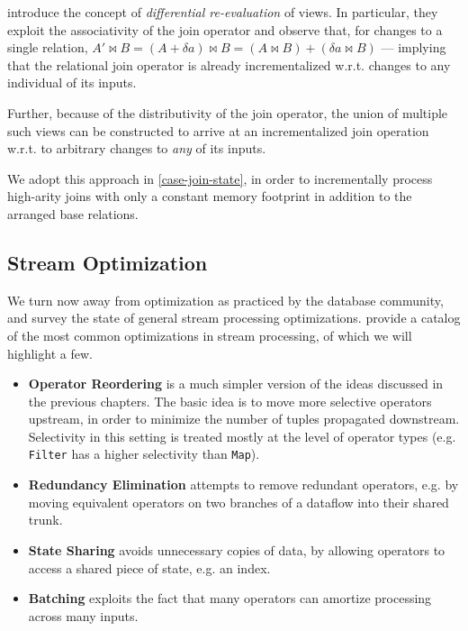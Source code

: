 \documentclass[../index.tex]{subfiles}
\begin{document}
\cite{blakeley1986efficiently} introduce the concept of
\emph{differential re-evaluation} of views. In particular, they
exploit the associativity of the join operator and observe that, for
changes to a single relation, $A' \bowtie B = (A + \delta{a}) \bowtie
B = (A \bowtie B) + (\delta{a} \bowtie B)$ — implying that the
relational join operator is already incrementalized w.r.t. changes to
any individual of its inputs.

Further, because of the distributivity of the join operator, the union
of multiple such views can be constructed to arrive at an
incrementalized join operation w.r.t. to arbitrary changes to
\emph{any} of its inputs.

We adopt this approach in \autoref{case-join-state}, in order to
incrementally process high-arity joins with only a constant memory
footprint in addition to the arranged base relations.

\subsection{Stream Optimization}

We turn now away from optimization as practiced by the database
community, and survey the state of general stream processing
optimizations. \cite{hirzel2014catalog} provide a catalog of the most
common optimizations in stream processing, of which we will highlight
a few.

\begin{itemize}
  \item \textbf{Operator Reordering} is a much simpler version of the
    ideas discussed in the previous chapters. The basic idea is to
    move more selective operators upstream, in order to minimize the
    number of tuples propagated downstream. Selectivity in this
    setting is treated mostly at the level of operator types
    (e.g. \texttt{Filter} has a higher selectivity than \texttt{Map}).

  \item \textbf{Redundancy Elimination} attempts to remove redundant
    operators, e.g. by moving equivalent operators on two branches of
    a dataflow into their shared trunk.

  \item \textbf{State Sharing} avoids unnecessary copies of data, by
    allowing operators to access a shared piece of state, e.g. an
    index.

  \item \textbf{Batching} exploits the fact that many operators can
    amortize processing across many inputs.
\end{itemize}
\end{document}
